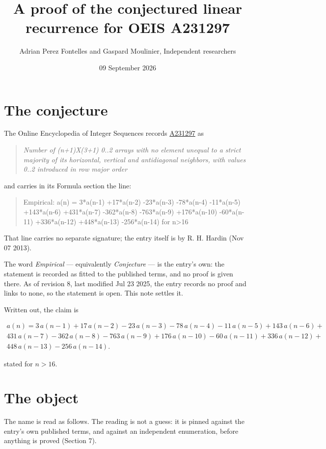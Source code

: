 \documentclass[11pt]{article}
\title{A proof of the conjectured linear recurrence for OEIS A231297}
\author{Adrian Perez Fontelles and Gaspard Moulinier, Independent researchers}
\date{09 September 2026}
\theoremstyle{definition}
\begin{document}
\maketitle
\section{The conjecture}

The Online Encyclopedia of Integer Sequences records \href{https://oeis.org/A231297}{A231297} as

\begin{quote}\itshape Number of (n+1)X(3+1) 0..2 arrays with no element unequal to a strict majority of its horizontal, vertical and antidiagonal neighbors, with values 0..2 introduced in row major order\end{quote}

and carries in its Formula section the line:

\begin{quote}\ttfamily Empirical: a(n) = 3*a(n-1) +17*a(n-2) -23*a(n-3) -78*a(n-4) -11*a(n-5) +143*a(n-6) +431*a(n-7) -362*a(n-8) -763*a(n-9) +176*a(n-10) -60*a(n-11) +336*a(n-12) +448*a(n-13) -256*a(n-14) for n>16\end{quote}

That line carries no separate signature; the entry itself is by R. H. Hardin (Nov 07 2013).

The word {\itshape Empirical} --- equivalently {\itshape Conjecture} --- is the entry's own: the statement is recorded as fitted to the published terms, and no proof is given there. As of revision 8, last modified Jul 23 2025, the entry records no proof and links to none, so the statement is open. This note settles it.

Written out, the claim is

\begin{multline*} a(n) = 3\,a(n-1) + 17\,a(n-2) - 23\,a(n-3) - 78\,a(n-4) - 11\,a(n-5) + 143\,a(n-6) + \\ 431\,a(n-7) - 362\,a(n-8) - 763\,a(n-9) + 176\,a(n-10) - 60\,a(n-11) + 336\,a(n-12) + \\ 448\,a(n-13) - 256\,a(n-14). \end{multline*}

stated for $n > 16$.

\section{The object}

The name is read as follows. The reading is not a guess: it is pinned against the entry's own published terms, and against an independent enumeration, before anything is proved (Section 7).
\end{document}
